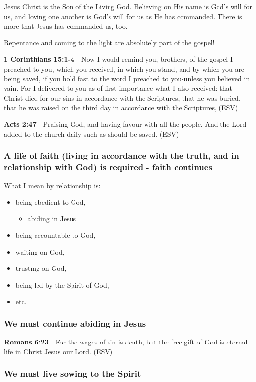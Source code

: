 \documentclass[11pt]{article}
\begin{document}
Jesus Christ is the Son of the Living God. Believing on His name is God's will for us, and loving one another is God's will for us as He has commanded. There is more that Jesus has commanded us, too.

Repentance and coming to the light are absolutely part of the gospel!

\textbf{1 Corinthians 15:1-4} -  Now I would remind you, brothers, of the gospel I preached to you, which you received, in which you stand, and by which you are being saved, if you hold fast to the word I preached to you-unless you believed in vain.  For I delivered to you as of first importance what I also received: that Christ died for our sins in accordance with the Scriptures, that he was buried, that he was raised on the third day in accordance with the Scriptures,  (ESV)

\textbf{Acts 2:47} - Praising God, and having favour with all the people. And the Lord added to the church daily such as should be saved. (ESV)

\subsubsection{A life of faith (living in accordance with the truth, and in relationship with God) is required - faith continues}
\label{sec:org860e219}
What I mean by relationship is:
\begin{itemize}
\item being obedient to God,
\begin{itemize}
\item abiding in Jesus
\end{itemize}
\item being accountable to God,
\item waiting on God,
\item trusting on God,
\item being led by the Spirit of God,
\item etc.
\end{itemize}

\subsubsection{We must continue abiding in Jesus}
\label{sec:orgd6114bf}

\textbf{Romans 6:23} - For the wages of sin is death, but the free gift of God is eternal life \uline{in} Christ Jesus our Lord. (ESV)

\subsubsection{We must live sowing to the Spirit}
\label{sec:org6282e34}
\end{document}
